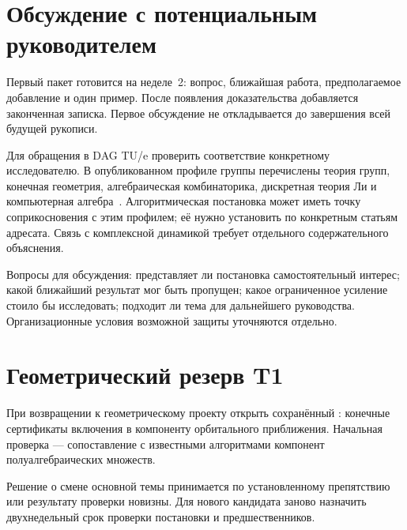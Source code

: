 \section{Обсуждение с потенциальным руководителем}
Первый пакет готовится на неделе~2: вопрос, ближайшая работа, предполагаемое
добавление и один пример. После появления доказательства добавляется
законченная записка. Первое обсуждение не откладывается до завершения
всей будущей рукописи.

Для обращения в DAG TU/e проверить соответствие конкретному исследователю.
В опубликованном профиле группы перечислены теория групп, конечная
геометрия, алгебраическая комбинаторика, дискретная теория Ли
и компьютерная алгебра~\cite{DAG}. Алгоритмическая постановка может иметь
точку соприкосновения с этим профилем; её нужно установить по конкретным
статьям адресата. Связь с комплексной динамикой требует отдельного
содержательного объяснения.

Вопросы для обсуждения: представляет ли постановка самостоятельный
интерес; какой ближайший результат мог быть пропущен; какое ограниченное
усиление стоило бы исследовать; подходит ли тема для дальнейшего
руководства. Организационные условия возможной защиты уточняются отдельно.

\section{Геометрический резерв T1}
При возвращении к геометрическому проекту открыть сохранённый
: конечные сертификаты включения
в компоненту орбитального приближения. Начальная проверка ---
сопоставление с известными алгоритмами компонент полуалгебраических множеств.

Решение о смене основной темы принимается по установленному препятствию
или результату проверки новизны. Для нового кандидата заново назначить
двухнедельный срок проверки постановки и предшественников.
